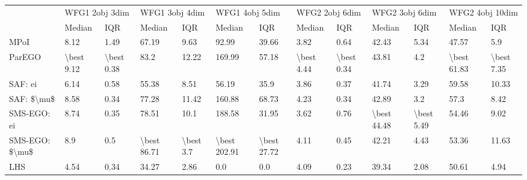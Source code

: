 \begin{tabular}{lllllllllllll}
\toprule
{} & \multicolumn{2}{l}{WFG1 2obj 3dim} & \multicolumn{2}{l}{WFG1 3obj 4dim} & \multicolumn{2}{l}{WFG1 4obj 5dim} & \multicolumn{2}{l}{WFG2 2obj 6dim} & \multicolumn{2}{l}{WFG2 3obj 6dim} & \multicolumn{2}{l}{WFG2 4obj 10dim} \\
{} &         Median &         IQR &         Median &        IQR &         Median &          IQR &         Median &         IQR &         Median &         IQR &          Median &         IQR \\
\midrule
MPoI           &           8.12 &        1.49 &          67.19 &       9.63 &          92.99 &        39.66 &           3.82 &        0.64 &          42.43 &        5.34 &           47.57 &         5.9 \\
ParEGO         &     \textbackslash best 9.12 &  \textbackslash best 0.38 &           83.2 &      12.22 &         169.99 &        57.18 &     \textbackslash best 4.44 &  \textbackslash best 0.34 &          43.81 &         4.2 &     \textbackslash best 61.83 &  \textbackslash best 7.35 \\
SAF: ei        &           6.14 &        0.58 &          55.38 &       8.51 &          56.19 &         35.9 &           3.86 &        0.37 &          41.74 &        3.29 &           59.58 &       10.33 \\
SAF: \$\textbackslash mu\$     &           8.58 &        0.34 &          77.28 &      11.42 &         160.88 &        68.73 &           4.23 &        0.34 &          42.89 &         3.2 &            57.3 &        8.42 \\
SMS-EGO: ei    &           8.74 &        0.35 &          78.51 &       10.1 &         188.58 &        31.95 &           3.62 &        0.76 &    \textbackslash best 44.48 &  \textbackslash best 5.49 &           54.46 &        9.02 \\
SMS-EGO: \$\textbackslash mu\$ &            8.9 &         0.5 &    \textbackslash best 86.71 &  \textbackslash best 3.7 &   \textbackslash best 202.91 &  \textbackslash best 27.72 &           4.11 &        0.45 &          42.21 &        4.43 &           53.36 &       11.63 \\
LHS            &           4.54 &        0.34 &          34.27 &       2.86 &            0.0 &          0.0 &           4.09 &        0.23 &          39.34 &        2.08 &           50.61 &        4.94 \\
\bottomrule
\end{tabular}

